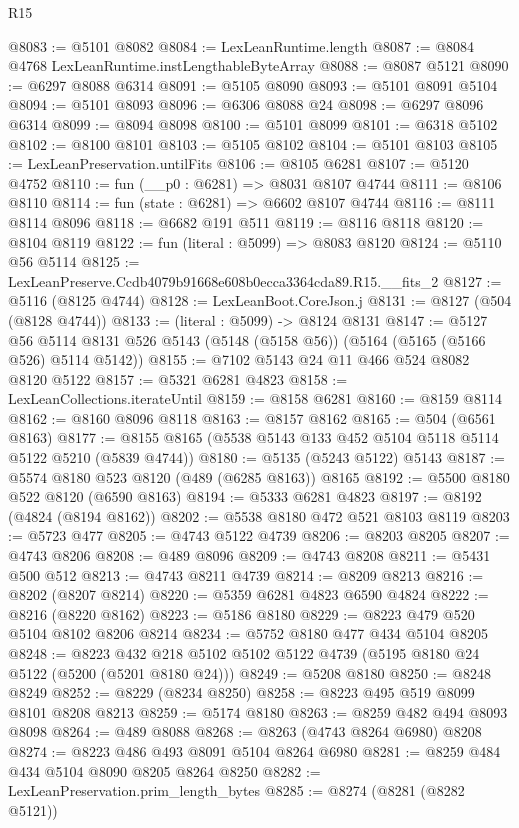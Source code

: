 \begin{lexlean}{R15}
\begin{coremodule}
{{{{{{{{{{{@8083 := @5101 @8082
@8084 := LexLeanRuntime.length
@8087 := @8084 @4768 LexLeanRuntime.instLengthableByteArray
@8088 := @8087 @5121
@8090 := @6297 @8088 @6314
@8091 := @5105 @8090
@8093 := @5101 @8091 @5104
@8094 := @5101 @8093
@8096 := @6306 @8088 @24
@8098 := @6297 @8096 @6314
@8099 := @8094 @8098
@8100 := @5101 @8099
@8101 := @6318 @5102
@8102 := @8100 @8101
@8103 := @5105 @8102
@8104 := @5101 @8103
@8105 := LexLeanPreservation.untilFits
@8106 := @8105 @6281
@8107 := @5120 @4752
@8110 := fun (__p0 : @6281) => @8031 @8107 @4744
@8111 := @8106 @8110
@8114 := fun (state : @6281) => @6602 @8107 @4744
@8116 := @8111 @8114 @8096
@8118 := @6682 @191 @511
@8119 := @8116 @8118
@8120 := @8104 @8119
@8122 := fun (literal : @5099) => @8083 @8120
@8124 := @5110 @56 @5114
@8125 := LexLeanPreserve.Ccdb4079b91668e608b0ecca3364cda89.R15.__fits_2
@8127 := @5116 (@8125 @4744)
@8128 := LexLeanBoot.CoreJson.j
@8131 := @8127 (@504 (@8128 @4744))
@8133 := (literal : @5099) -> @8124 @8131
@8147 := @5127
    @56
    @5114
    @8131
    @526
    @5143
    (@5148 (@5158 @56))
    (@5164 (@5165 (@5166 @526) @5114 @5142))
@8155 := @7102 @5143 @24 @11 @466 @524 @8082 @8120 @5122
@8157 := @5321 @6281 @4823
@8158 := LexLeanCollections.iterateUntil
@8159 := @8158 @6281
@8160 := @8159 @8114
@8162 := @8160 @8096 @8118
@8163 := @8157 @8162
@8165 := @504 (@6561 @8163)
@8177 := @8155 @8165 (@5538 @5143 @133 @452 @5104 @5118 @5114 @5122 @5210 (@5839 @4744))
@8180 := @5135 (@5243 @5122) @5143
@8187 := @5574 @8180 @523 @8120 (@489 (@6285 @8163)) @8165
@8192 := @5500 @8180 @522 @8120 (@6590 @8163)
@8194 := @5333 @6281 @4823
@8197 := @8192 (@4824 (@8194 @8162))
@8202 := @5538 @8180 @472 @521 @8103 @8119
@8203 := @5723 @477
@8205 := @4743 @5122 @4739
@8206 := @8203 @8205
@8207 := @4743 @8206
@8208 := @489 @8096
@8209 := @4743 @8208
@8211 := @5431 @500 @512
@8213 := @4743 @8211 @4739
@8214 := @8209 @8213
@8216 := @8202 (@8207 @8214)
@8220 := @5359 @6281 @4823 @6590 @4824
@8222 := @8216 (@8220 @8162)
@8223 := @5186 @8180
@8229 := @8223 @479 @520 @5104 @8102 @8206 @8214
@8234 := @5752 @8180 @477 @434 @5104 @8205
@8248 := @8223 @432 @218 @5102 @5102 @5122 @4739 (@5195 @8180 @24 @5122 (@5200 (@5201 @8180 @24)))
@8249 := @5208 @8180
@8250 := @8248 @8249
@8252 := @8229 (@8234 @8250)
@8258 := @8223 @495 @519 @8099 @8101 @8208 @8213
@8259 := @5174 @8180
@8263 := @8259 @482 @494 @8093 @8098
@8264 := @489 @8088
@8268 := @8263 (@4743 @8264 @6980) @8208
@8274 := @8223 @486 @493 @8091 @5104 @8264 @6980
@8281 := @8259 @484 @434 @5104 @8090 @8205 @8264 @8250
@8282 := LexLeanPreservation.prim_length_bytes
@8285 := @8274 (@8281 (@8282 @5121))
}}}}}}}}}}}
\end{coremodule}
\end{lexlean}
